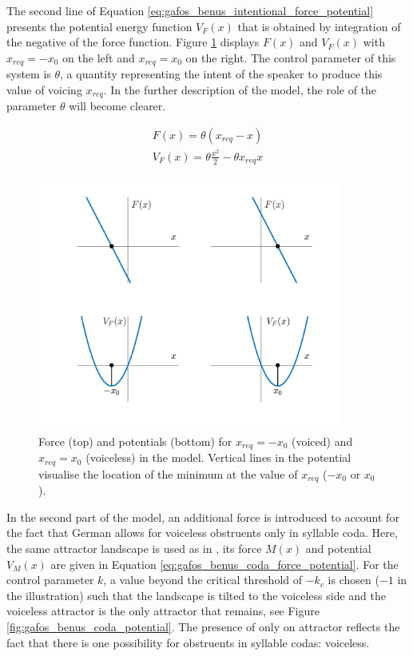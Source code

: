 The second line of Equation \ref{eq:gafos_benus_intentional_force_potential} presents the potential energy function $V_F(x)$ that is obtained by integration of the negative of the force function. Figure \ref{fig:gafos_benus_intentional_force_potential} displays $F(x)$ and $V_F(x)$ with $x_{req} = -x_0$ on the left and $x_{req} = x_0$ on the right. The control parameter of this system is $\theta$, a quantity representing the intent of the speaker to produce this value of voicing $x_{req}$. In the further description of the model, the role of the parameter $\theta$ will become clearer.

\begin{equation}
\begin{split}
F(x) = \theta (x_{req} - x) \\
V_F(x) = \theta \frac{x^2}{2} -\theta x_{req} x
\end{split}
\label{eq:gafos_benus_intentional_force_potential}
\end{equation}

\begin{figure}
\includegraphics[width=10cm]{figures/ch3/gafos_benus_intentional_dynamics.pdf}
\caption[Force and potential for voiced and voiceless obstruents in the \citet{GafosBenus2006} model.]{Force (top) and potentials (bottom) for $x_{req} = -x_0$ (voiced) and $x_{req} = x_0$ (voiceless) in the \citet{GafosBenus2006} model. Vertical lines in the potential visualise the location of the minimum at the value of $x_{req}$ ($-x_0$ or $x_0$).}
\label{fig:gafos_benus_intentional_force_potential}
\end{figure}

In the second part of the model, an additional force is introduced to account for the fact that German allows for voiceless obstruents only in syllable coda. Here, the same attractor landscape is used as in \citet{Tulleretal1994}, its force $M(x)$ and potential $V_M(x)$ are given in Equation \ref{eq:gafos_benus_coda_force_potential}. For the control parameter $k$, a value beyond the critical threshold of $-k_c$ is chosen ($-1$ in the illustration) such that the landscape is tilted to the voiceless side and the voiceless attractor is the only attractor that remains, see Figure \ref{fig:gafos_benus_coda_potential}. The presence of only on attractor reflects the fact that there is one possibility for obstruents in syllable codas: voiceless.

